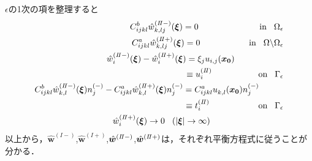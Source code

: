 $\epsilon$の1次の項を整理すると
\begin{align}
	C_{ijkl}^{b} \hat{w}^{(I\hspace{-.15em}I-)}_{k,lj}(\bm{\xi})=0
	\hspace{2.5cm}
	\text{in}\hspace{0.3cm}\Omega_{\epsilon}
	\label{eq:GovDisturIn2}
	\\
	C_{ijkl}^{a} \hat{w}^{(I\hspace{-.15em}I+)}_{k,lj}(\bm{\xi})=0
	\hspace{2.0cm}
	\text{in}\hspace{0.3cm}\Omega\backslash\Omega_{\epsilon}
	\label{eq:GovDisturOut2}
	\\
	\hat{w}_{i}^{(I\hspace{-.15em}I-)}(\bm{\xi})
	-\hat{w}_{i}^{(I\hspace{-.15em}I+)}(\bm{\xi})= \xi_j u_{i,j}(\bm{x_0})
	\hspace{2.0cm}
	\nonumber
	\\
	\equiv u_{i}^{(I\hspace{-.15em}I)}
	\hspace{1.9cm}\text{on}\hspace{0.3cm}\Gamma_{\epsilon}
	\label{eq:GovDisturUBC2}
	\\
	C_{ijkl}^{b}\hat{w}_{k,l}^{(I\hspace{-.15em}I-)}(\bm{\xi})n_{j}^{(-)}
	-C_{ijkl}^{a}\hat{w}_{k,l}^{(I\hspace{-.15em}I+)}(\bm{\xi})n_{j}^{(-)}
	=C_{ijkl}^{a} u_{k,l}^{}(\bm{x_0})n_{j}^{(-)}
	\hspace{1.0cm}
	\nonumber
	\\
	\equiv t_{i}^{(I\hspace{-.15em}I)}
	\hspace{2.0cm}\text{on}\hspace{0.3cm}\Gamma_{\epsilon}
	\label{eq:GovDisturSBC2}
	\\
	\hat{w}_{i}^{(I\hspace{-.15em}I+)}(\bm{\xi})\rightarrow 0 \hspace{0.3cm} (|\bm{\xi}|\rightarrow \infty)
	\hspace{3.0cm}
	\label{eq:GovDisturInftyBC2}
\end{align}
以上から，$\hat{\bm{w}}^{(I-)}$,$\hat{\bm{w}}^{(I+)}$,$\hat{\bm{w}}^{(I\hspace{-.15em}I-)}$,$\hat{\bm{w}}^{(I\hspace{-.15em}I+)}$は，それぞれ平衡方程式に従うことが分かる．

\newpage
